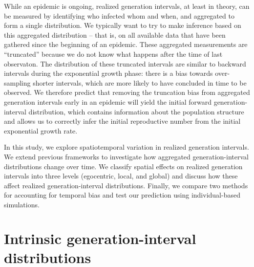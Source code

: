 \documentclass[12pt]{article}
\begin{document}
While an epidemic is ongoing, realized generation intervals, at least in theory, can be measured by identifying who infected whom and when, and aggregated to form a single distribution.
We typically want to try to make inference based on this aggregated distribution -- that is, on all available data that have been gathered since the beginning of an epidemic.
These aggregated measurements are ``truncated'' because we do not know what happens after the time of last observaton.
The distribution of these truncated intervals are similar to backward intervals during the exponential growth phase: there is a bias towards over-sampling shorter intervals, which are more likely to have concluded in time to be observed.
We therefore predict that removing the truncation bias from aggregated generation intervals early in an epidemic will yield the initial forward generation-interval distribution, which contains information about the population structure and allows us to correctly infer the initial reproductive number from the initial exponential growth rate.

In this study, we explore spatiotemporal variation in realized generation intervals.
We extend previous frameworks to investigate how aggregated generation-interval distributions change over time.
We classify spatial effects on realized generation intervals into three levels (egocentric, local, and global) and discuss how these affect realized generation-interval distributions.
Finally, we compare two methods for accounting for temporal bias and test our prediction using individual-based simulations.

\section{Intrinsic generation-interval distributions}
\end{document}
